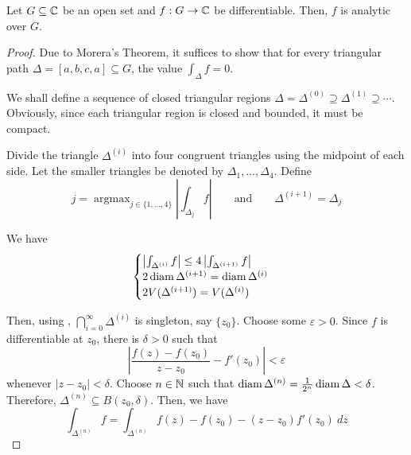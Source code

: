 \begin{theorem}[Goursat]
    Let $G\subseteq\mathbb{C}$ be an open set and $f: G\to\mathbb{C}$ be differentiable. Then, $f$ is analytic over $G$.
\end{theorem}
\begin{proof}
    Due to Morera's Theorem, it suffices to show that for every triangular path $\Delta = [a,b,c,a]\subseteq G$, the value $\int_\Delta f = 0$. 

    We shall define a sequence of closed triangular regions $\Delta = \Delta^{(0)}\supseteq\Delta^{(1)}\supseteq\cdots$. Obviously, since each triangular region is closed and bounded, it must be compact.

    Divide the triangle $\Delta^{(i)}$ into four congruent triangles using the midpoint of each side. Let the smaller triangles be denoted by $\Delta_1,\ldots,\Delta_4$. Define 
    \begin{equation*}
        j = \operatorname{argmax}_{j\in\{1,\ldots,4\}}\left|\int_{\Delta_j} f\right|\qquad\text{and}\qquad\Delta^{(i + 1)} = \Delta_j
    \end{equation*}

    We have 
    \begin{equation*}
        \begin{cases}
            \left|\int_{\Delta^{(i)}}f\right|\le 4\left|\int_{\Delta^{(i+1)}}f\right|\\
            2\operatorname{diam}\Delta^{(i + 1)} = \operatorname{diam}\Delta^{(i)}\\
            2V(\Delta^{(i + 1)}) = V(\Delta^{(i)})
        \end{cases}
    \end{equation*}

    Then, using , $\bigcap\limits_{i = 0}^\infty\Delta^{(i)}$ is singleton, say $\{z_0\}$. Choose some $\varepsilon > 0$. Since $f$ is differentiable at $z_0$, there is $\delta > 0$ such that 
    \begin{equation*}
        \left|\frac{f(z) - f(z_0)}{z - z_0} - f'(z_0)\right| < \varepsilon
    \end{equation*}
    whenever $|z - z_0| < \delta$. Choose $n\in\mathbb{N}$ such that $\operatorname{diam}\Delta^{(n)} = \frac{1}{2^n}\operatorname{diam}\Delta < \delta$. Therefore, $\Delta^{(n)}\subseteq B(z_0,\delta)$. Then, we have 
    \begin{equation*}
        \int_{\Delta^{(n)}} f = \int_{\Delta^{(n)}} f(z) - f(z_0) - (z - z_0)f'(z_0)~dz
    \end{equation*}


\end{proof}
